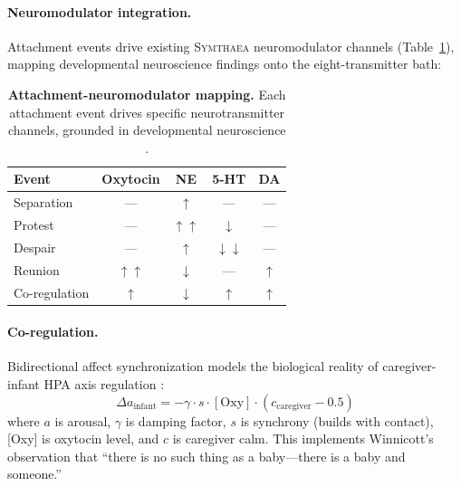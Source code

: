 \documentclass[11pt,letterpaper]{article}
\newcommand{\symthaea}{\textsc{Symthaea}}
\begin{document}
\paragraph{Neuromodulator integration.} Attachment events drive existing
\symthaea{} neuromodulator channels (Table~\ref{tab:neuromod}), mapping
developmental neuroscience findings \cite{feldman2012oxytocin,feldman2017neurobiology}
onto the eight-transmitter bath:

\begin{table}[htbp]
\centering
\caption{\textbf{Attachment-neuromodulator mapping.} Each attachment event drives
specific neurotransmitter channels, grounded in developmental neuroscience
\cite{feldman2012oxytocin,schore2001effects}.}
\label{tab:neuromod}
\begin{tabular}{lcccc}
\toprule
\textbf{Event} & \textbf{Oxytocin} & \textbf{NE} & \textbf{5-HT} & \textbf{DA} \\
\midrule
Separation      & ---           & $\uparrow$   & ---           & --- \\
Protest         & ---           & $\uparrow\uparrow$ & $\downarrow$ & --- \\
Despair         & ---           & $\uparrow$   & $\downarrow\downarrow$ & --- \\
Reunion         & $\uparrow\uparrow$ & $\downarrow$ & ---       & $\uparrow$ \\
Co-regulation   & $\uparrow$   & $\downarrow$ & $\uparrow$    & $\uparrow$ \\
\bottomrule
\end{tabular}
\end{table}

\paragraph{Co-regulation.} Bidirectional affect synchronization models the
biological reality of caregiver-infant HPA axis regulation
\cite{schore2001effects}:
\begin{equation}
\Delta a_\text{infant} = -\gamma \cdot s \cdot [\text{Oxy}] \cdot (c_\text{caregiver} - 0.5)
\label{eq:coreg}
\end{equation}
where $a$ is arousal, $\gamma$ is damping factor, $s$ is synchrony (builds with
contact), [Oxy] is oxytocin level, and $c$ is caregiver calm. This implements
Winnicott's \cite{winnicott1965maturational} observation that ``there is no such
thing as a baby---there is a baby and someone.''
\end{document}
